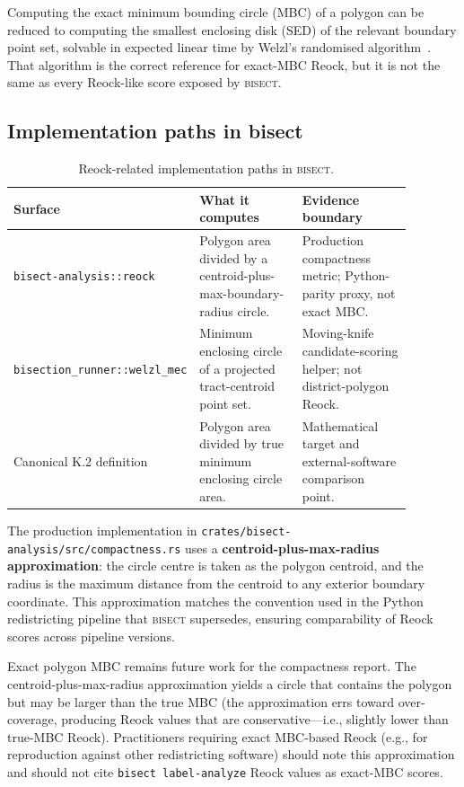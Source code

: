 Computing the exact minimum bounding circle (MBC) of a polygon can be reduced to
computing the smallest enclosing disk (SED) of the relevant boundary point set,
solvable in expected linear time by Welzl's randomised algorithm~\citep{welzl1991smallest}.
That algorithm is the correct reference for exact-MBC Reock, but it is not the
same as every Reock-like score exposed by \textsc{bisect}.

\subsection{Implementation paths in bisect}

\begin{table}[ht]
\centering
\caption{Reock-related implementation paths in \textsc{bisect}.}
\label{tab:reock_implementation_paths}
\begin{tabular}{p{0.26\linewidth}p{0.31\linewidth}p{0.31\linewidth}}
\toprule
Surface & What it computes & Evidence boundary \\
\midrule
\texttt{bisect-analysis::reock} &
Polygon area divided by a centroid-plus-max-boundary-radius circle. &
Production compactness metric; Python-parity proxy, not exact MBC. \\
\texttt{bisection\_runner::welzl\_mec} &
Minimum enclosing circle of a projected tract-centroid point set. &
Moving-knife candidate-scoring helper; not district-polygon Reock. \\
Canonical K.2 definition &
Polygon area divided by true minimum enclosing circle area. &
Mathematical target and external-software comparison point. \\
\bottomrule
\end{tabular}
\end{table}

The production implementation in
\texttt{crates/bisect-analysis/src/compactness.rs} uses a
\textbf{centroid-plus-max-radius approximation}: the circle centre is taken as
the polygon centroid, and the radius is the maximum distance from the centroid
to any exterior boundary coordinate.  This approximation matches the convention
used in the Python redistricting pipeline that \textsc{bisect} supersedes,
ensuring comparability of Reock scores across pipeline versions.

\begin{remark}
Exact polygon MBC remains future work for the compactness report.
The centroid-plus-max-radius approximation yields a circle that contains the polygon
but may be larger than the true MBC (the approximation errs toward over-coverage,
producing Reock values that are conservative---i.e., slightly lower than true-MBC Reock).
Practitioners requiring exact MBC-based Reock (e.g., for reproduction against
other redistricting software) should note this approximation and should not cite
\texttt{bisect label-analyze} Reock values as exact-MBC scores.
\end{remark}

